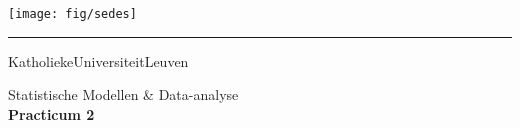 \begin{titlepage}
    \newpage
    \thispagestyle{empty}
    \frenchspacing
    \hspace{-0.2cm}
    \texttt{[image: fig/sedes]}
    \hspace{0.2cm}
    \rule{0.5pt}{4.2cm}
    \hspace{0.2cm}
    \begin{minipage}[b]{8cm}
        \Large{Katholieke\newline Universiteit\newline Leuven}\smallskip\newline
    \end{minipage}
    \vspace*{3.2cm}\vfill
    \begin{center}
        \begin{minipage}[t]{\textwidth}
            \begin{center}
            	\LARGE{\rm{Statistische Modellen \& Data-analyse}}\\[5mm]
                \LARGE{\rm{\textbf{Practicum 2}}}
            \end{center}
        \end{minipage}
    \end{center}
    \vfill
    \hfill{}
\end{titlepage}